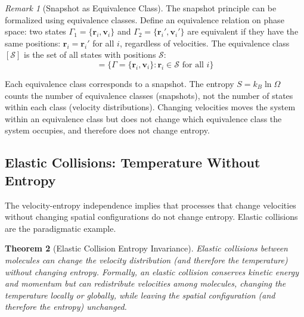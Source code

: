 \documentclass[12pt,a4paper]{article}
\newtheorem{theorem}{Theorem}[section]
\theoremstyle{definition}
\theoremstyle{remark}
\newtheorem{remark}[theorem]{Remark}
\begin{document}
\begin{remark}[Snapshot as Equivalence Class]
\label{rem:snapshot_equivalence}
The snapshot principle can be formalized using equivalence classes. Define an equivalence relation on phase space: two states $\Gamma_1 = \{\mathbf{r}_i, \mathbf{v}_i\}$ and $\Gamma_2 = \{\mathbf{r}_i', \mathbf{v}_i'\}$ are equivalent if they have the same positions: $\mathbf{r}_i = \mathbf{r}_i'$ for all $i$, regardless of velocities. The equivalence class $[\mathcal{S}]$ is the set of all states with positions $\mathcal{S}$:
\begin{equation}
[\mathcal{S}] = \{\Gamma = \{\mathbf{r}_i, \mathbf{v}_i\} : \mathbf{r}_i \in \mathcal{S} \text{ for all } i\}
\end{equation}

Each equivalence class corresponds to a snapshot. The entropy $S = k_B \ln \Omega$ counts the number of equivalence classes (snapshots), not the number of states within each class (velocity distributions). Changing velocities moves the system within an equivalence class but does not change which equivalence class the system occupies, and therefore does not change entropy.
\end{remark}

\subsection{Elastic Collisions: Temperature Without Entropy}

The velocity-entropy independence implies that processes that change velocities without changing spatial configurations do not change entropy. Elastic collisions are the paradigmatic example.

\begin{theorem}[Elastic Collision Entropy Invariance]
\label{thm:elastic_entropy}
Elastic collisions between molecules can change the velocity distribution (and therefore the temperature) without changing entropy. Formally, an elastic collision conserves kinetic energy and momentum but can redistribute velocities among molecules, changing the temperature locally or globally, while leaving the spatial configuration (and therefore the entropy) unchanged.
\end{theorem}
\end{document}
